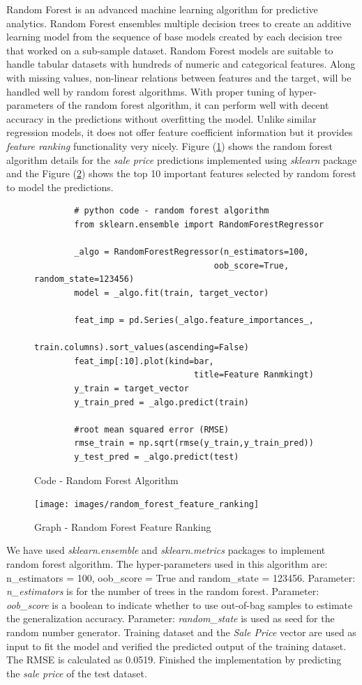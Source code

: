 \documentclass[sigconf]{acmart}
\begin{document}
    Random Forest is an advanced machine learning algorithm for predictive analytics. Random Forest ensembles multiple decision trees to create an additive learning model from the sequence of base models created by each decision tree that worked on a sub-sample dataset. Random Forest models are suitable to handle tabular datasets with hundreds of numeric and categorical features. Along with missing values, non-linear relations between features and the target, will be handled well by random forest algorithms. With proper tuning of hyper-parameters of the random forest algorithm, it can perform well with decent accuracy in the predictions without overfitting the model. Unlike similar regression models, it does not offer feature coefficient information but it provides {\em feature ranking} functionality very nicely. Figure (\ref{c:rf}) shows the random forest algorithm details for the {\em sale price} predictions implemented using {\em sklearn} package and the Figure (\ref{fig:random-feature-ranking}) shows the top 10 important features selected by random forest to model the predictions.
	
		\begin{figure}[htb]
		\begin{verbatim}		
		# python code - random forest algorithm
		from sklearn.ensemble import RandomForestRegressor		
				
		_algo = RandomForestRegressor(n_estimators=100, 
									oob_score=True, random_state=123456)		
		model = _algo.fit(train, target_vector)  
		
		feat_imp = pd.Series(_algo.feature_importances_, 
							train.columns).sort_values(ascending=False)							
		feat_imp[:10].plot(kind=bar, 
								title=Feature Ranmkingt)		
		y_train = target_vector
		y_train_pred = _algo.predict(train)
		
		#root mean squared error (RMSE)
		rmse_train = np.sqrt(rmse(y_train,y_train_pred))			
		y_test_pred = _algo.predict(test)		
		\end{verbatim}
		\caption{Code - Random Forest Algorithm} \label{c:rf} 
		\end{figure}


	\begin{figure}[htb]
		\centering
		\texttt{[image: images/random\_forest\_feature\_ranking]}	
		\caption{Graph - Random Forest Feature Ranking} \label{fig:random-feature-ranking} 
	\end{figure}
		
	We have used {\em sklearn.ensemble} and {\em sklearn.metrics} packages to implement random forest algorithm. The hyper-parameters used in this algorithm are: n\_estimators = 100, oob\_score = True and random\_state = 123456. Parameter: {\em n\_estimators} is for the number of trees in the random forest. Parameter: {\em oob\_score} is a boolean to indicate whether to use out-of-bag samples to estimate the generalization accuracy. Parameter: {\em random\_state} is used as seed for the random number generator. Training dataset and the {\em Sale Price} vector are used as input to fit the model and verified the predicted output of the training dataset. The RMSE is calculated as 0.0519. Finished the implementation by predicting the {\em sale price} of the test dataset. 
	
\end{document}
